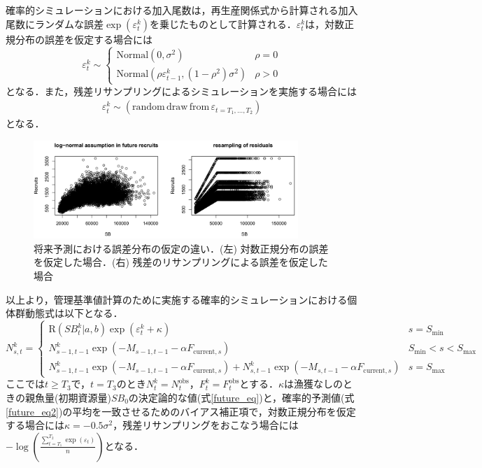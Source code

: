 \documentclass[11pt]{jsarticle}
\begin{document}
確率的シミュレーションにおける加入尾数は，再生産関係式から計算される加入尾数にランダムな誤差$\exp (\varepsilon_t^k)$を乗じたものとして計算される．$\varepsilon_t^k$は，対数正規分布の誤差を仮定する場合には
\begin{equation}
  \varepsilon_t^k \sim \begin{cases}
    \mathrm{Normal} (0,\sigma^2 ) & \rho=0 \\
    \mathrm{Normal} (\rho \varepsilon_{t-1}^k,(1-\rho^2) \sigma^2) & \rho>0
  \end{cases}
  \label{epsilon1}
\end{equation}
となる．また，残差リサンプリングによるシミュレーションを実施する場合には
\begin{eqnarray}
  \varepsilon_t^k \sim (\mathrm{random} \, \mathrm{draw} \, \mathrm{from} \, \varepsilon_{t={T_1,…,T_2}})
  \label{epsilon2}  
\end{eqnarray}
となる．

\begin{figure}[t]
  \includegraphics[width=10cm]{fig_resample.png}
  \caption{将来予測における誤差分布の仮定の違い．(左) 対数正規分布の誤差を仮定した場合．(右) 残差のリサンプリングによる誤差を仮定した場合}
  \label{fig_resample}
\end{figure}

以上より，管理基準値計算のために実施する確率的シミュレーションにおける個体群動態式は以下となる．
\begin{equation}
  N_{s,t}^k = \begin{cases}
    \mathrm{R}(S\!B_{t}^k|a,b) \exp (\varepsilon_t^k + \kappa) &     s = S_\mathrm{min} \\    
    N_{s-1, t-1}^k  \exp(-M_{s-1,t-1}-\alpha F_{\mathrm{current},s} )  &    S_\mathrm{min} < s < S_\mathrm{max} \\
    N_{s-1, t-1}^k  \exp(-M_{s-1,t-1}-\alpha F_{\mathrm{current},s} ) + N_{s,t-1}^k  \exp(-M_{s,t-1} - \alpha F_{\mathrm{current},s} ) &   s=S_{\mathrm{max}}
  \end{cases}
  \label{future_eq2}
\end{equation}
ここでは$t \geq T_3$で，$t=T_3$のとき$N_t^k=N_t^{\mathrm{obs}}$，$F_t^k=F_t^{\mathrm{obs}}$とする．$\kappa$は漁獲なしのときの親魚量(初期資源量)$S\!B_0$の決定論的な値(式\ref{future_eq})と，確率的予測値(式\ref{future_eq2})の平均を一致させるためのバイアス補正項で，対数正規分布を仮定する場合には$\kappa=-0.5\sigma^2$，残差リサンプリングをおこなう場合には$-\log( \frac{\sum_{t=T_1}^{T_2} \exp(\varepsilon_t)}{n} )$となる．
\end{document}
